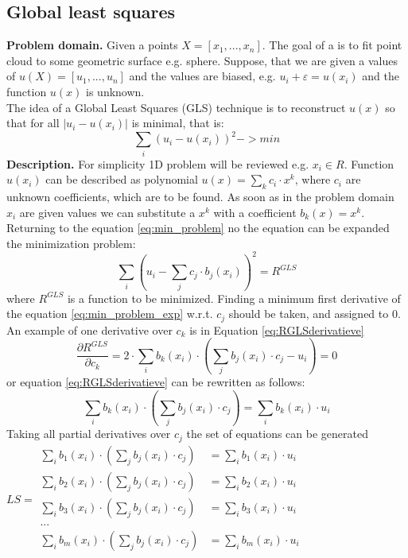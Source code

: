 \subsection{Global least squares}
\textbf{Problem domain.} Given a points $X = [x_1, ..., x_n]$. The goal of a is to fit point cloud to some geometric surface e.g. sphere. Suppose, that we are given a values of $u(X) = [u_1, ..., u_n]$ and the values are biased, e.g. $u_i + \varepsilon = u(x_i)$ and the function $u(x)$ is unknown.\\ 
The idea of a Global Least Squares (GLS) technique is to reconstruct $u(x)$ so that for all $|u_i - u(x_i)|$ is minimal, that is:
\begin{equation}
	\sum_i (u_i - u(x_i))^2 -> min
	\label{eq:min_problem}
\end{equation}
\textbf{Description.} For simplicity 1D problem will be reviewed e.g. $x_i \in R$. Function $u(x_i)$ can be described as polynomial $u(x)=\sum_k{c_i \cdot x^k}$, where $c_i$ are unknown coefficients, which are to be found.
As soon as in the problem domain $x_i$ are given values we can substitute a $x^k$ with a coefficient $b_k(x) = x^k$. Returning to the equation \ref{eq:min_problem} no the equation can be expanded the minimization problem:
\begin{equation}
	\sum_i (u_i - \sum_j{c_j \cdot b_j(x_i)})^2 = R^{GLS}
	\label{eq:min_problem_exp}
\end{equation}
where $R^{GLS}$ is a function to be minimized. Finding a minimum first derivative of the equation \ref{eq:min_problem_exp} w.r.t. $c_j$ should be taken, and assigned to 0. An example of one derivative over $c_k$ is in Equation \ref{eq:RGLSderivatieve}
\begin{equation}
	\dfrac{\partial R^{GLS}}{\partial c_k} = 2\cdot \sum_i{b_k(x_i) \cdot (\sum_j{b_j(x_i)\cdot c_j} - u_i)} = 0
	\label{eq:RGLSderivatieve}
\end{equation}
or equation \ref{eq:RGLSderivatieve}  can be rewritten as follows:
\begin{equation}
	\sum_i{b_k(x_i) \cdot (\sum_j{b_j(x_i)\cdot c_j})}  = \sum_i {b_k(x_i) \cdot u_i}
	\label{eq:RGLSderFinal}
\end{equation}
Taking all partial derivatives over $c_j$ the set of equations can be generated $LS = 
\begin{matrix}
	\sum_i{b_1(x_i) \cdot (\sum_j{b_j(x_i)\cdot c_j})}  &= \sum_i {b_1(x_i) \cdot u_i}\\
	\sum_i{b_2(x_i) \cdot (\sum_j{b_j(x_i)\cdot c_j})}  &= \sum_i {b_2(x_i) \cdot u_i}\\
	\sum_i{b_3(x_i) \cdot (\sum_j{b_j(x_i)\cdot c_j})}  &= \sum_i {b_3(x_i) \cdot u_i}\\
	...\\
	\sum_i{b_m(x_i) \cdot (\sum_j{b_j(x_i)\cdot c_j})}  &= \sum_i {b_m(x_i) \cdot u_i}\\
\end{matrix}$\\
